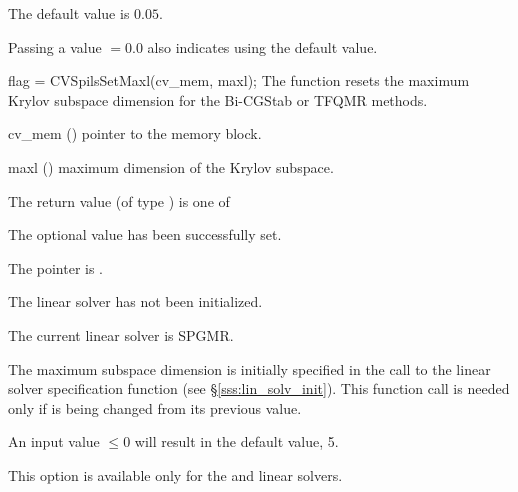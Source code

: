 {
  The default value is $0.05$.

  Passing a value $ = 0.0$ also indicates using the default value.
}
{
  flag = CVSpilsSetMaxl(cv\_mem, maxl);
}
{
  The function  resets the maximum Krylov subspace
  dimension for the Bi-CGStab or TFQMR 
  methods.
}
{
  \begin{args}[cv\_mem]
  \item[cv\_mem] ()
    pointer to the {\cvodes} memory block.
  \item[maxl] ()
    maximum dimension of the Krylov subspace.
  \end{args}
}
{
  The return value  (of type ) is one of
  \begin{args}
  \item[\Id{CVSPILS\_SUCCESS}] 
    The optional value has been successfully set.
  \item[\Id{CVSPILS\_MEM\_NULL}]
    The  pointer is .
  \item[\Id{CVSPILS\_LMEM\_NULL}]
    The {\cvspils} linear solver has not been initialized.
  \item[\Id{CVSPILS\_ILL\_INPUT}]
    The current linear solver is SPGMR.  
  \end{args}
}
{
  The maximum subspace dimension is initially specified in the call
  to the linear solver specification function (see \S\ref{sss:lin_solv_init}). 
  This function call is needed only if  is being changed from its 
  previous value.

  An input value  $\leq 0$ will result in the default value, 5.

  {\warn}This option is available only for the {\cvspbcg} and {\cvsptfqmr} linear solvers.
}

